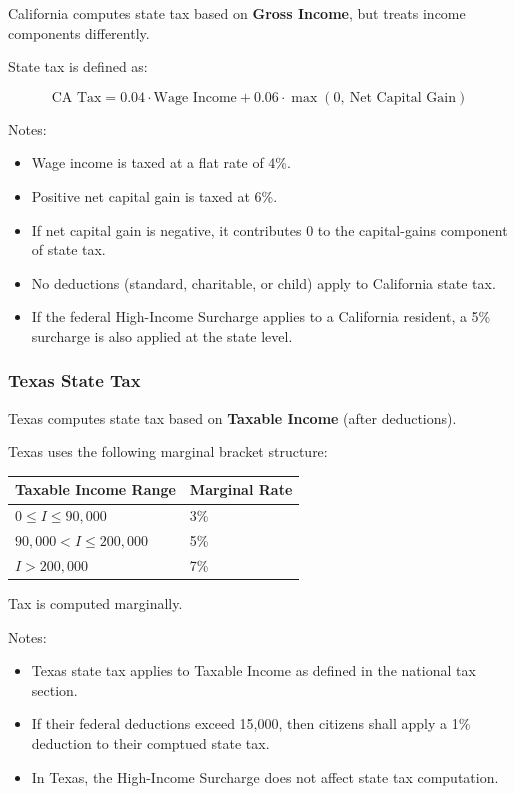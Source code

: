 California computes state tax based on \textbf{Gross Income}, but treats income components differently.

State tax is defined as:

\[
\text{CA Tax} = 0.04 \cdot \text{Wage Income}
+ 0.06 \cdot \max(0,\ \text{Net Capital Gain})
\]

Notes:

\begin{itemize}
  \item Wage income is taxed at a flat rate of 4\%.
  \item Positive net capital gain is taxed at 6\%.
  \item If net capital gain is negative, it contributes 0 to the capital-gains component of state tax.
  \item No deductions (standard, charitable, or child) apply to California state tax.
  \item If the federal High-Income Surcharge applies to a California resident, a 5\% surcharge is also applied at the state level.
\end{itemize}

\subsubsection{Texas State Tax}

Texas computes state tax based on \textbf{Taxable Income} (after deductions).

Texas uses the following marginal bracket structure:

\begin{center}
\begin{tabular}{l l}
\toprule
\textbf{Taxable Income Range} & \textbf{Marginal Rate} \\
\midrule
$0 \leq I \leq 90{,}000$ & 3\% \\
$90{,}000 < I \leq 200{,}000$ & 5\% \\
$I > 200{,}000$ & 7\% \\
\bottomrule
\end{tabular}
\end{center}

Tax is computed marginally.

Notes:

\begin{itemize}
  \item Texas state tax applies to Taxable Income as defined in the national tax section.
  \item If their federal deductions exceed 15,000, then citizens shall apply a 1\% deduction to their comptued state tax.
  \item In Texas, the High-Income Surcharge does not affect state tax computation.
\end{itemize}

